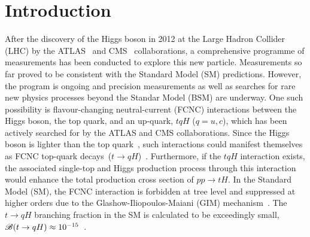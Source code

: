 \section{Introduction}
\label{sec:intro}
After the discovery of the Higgs boson in 2012 at the Large Hadron Collider (LHC) by the ATLAS~\cite{Aad:2012tfa} and 
CMS~\cite{Chatrchyan:2012ufa} collaborations, 
a comprehensive programme of measurements %
has been conducted to explore this new particle. Measurements so far proved to be consistent with the Standard Model (SM) predictions. 
However, the program is ongoing and precision measurements as well as searches for rare new physics processes beyond the Standar Model (BSM)
are underway. One such possibility is flavour-changing neutral-current (FCNC) interactions between the Higgs boson, 
the top quark, and an up-quark, $tqH$ ($q=u, c$), which has been actively searched for by the ATLAS and CMS collaborations.  
Since the Higgs boson is lighter than the top quark~\cite{Aad:2015zhl},
such interactions could manifest themselves as FCNC top-quark decays~($t\to qH$)~\cite{Agashe:2013hma}. Furthermore, if the $tqH$ interaction exists, the associated single-top and  Higgs  production process through this interaction would enhance 
the total
production cross section of $pp\rightarrow tH$.
In the Standard Model (SM), the FCNC interaction is forbidden at tree level and suppressed at higher orders due to the Glashow-Iliopoulos-Maiani (GIM) mechanism~\cite{Glashow:1970gm}. The $t\to qH$ branching fraction in the SM is calculated to be exceedingly small, $\mathscr{B}(t\to qH)\approx10^{-15}$~\cite{Eilam:1990zc,Mele:1998ag,AguilarSaavedra:2004wm,Zhang:2013xya}. 
